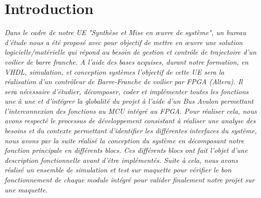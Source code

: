 \section*{Introduction}
\label{Introduction}
\textit{Dans le cadre de notre UE "Synthèse et Mise en œuvre de système", un bureau d'étude nous a été proposé avec pour objectif de mettre en œuvre une solution logicielle/matérielle qui répond au besoin de gestion et contrôle de trajectoire d'un voilier de barre franche.}\vspace{0.5cm}
\textit{\newline A l'aide des bases acquises, durant notre formation, en VHDL, simulation, et conception systèmes l'objectif de cette UE sera la réalisation d'un contrôleur de Barre-Franche de voilier par FPGA (Altera). Il sera nécessaire d'étudier, décomposer, coder et implémenter toutes les fonctions une à une et d'intégrer la globalité du projet à l'aide d'un Bus Avalon permettant l'interconnexion des fonctions au MCU intégré au FPGA.}\vspace{0.5cm}
\textit{\newline Pour réaliser cela, nous avons respecté le processus de développement consistant à réaliser une analyse  des besoins et du contexte permettant d'identifier les différentes interfaces du système, nous avons par la suite réalisé la conception du système en décomposant notre fonction principale en différents blocs. Ces différents blocs ont fait l'objet d'une description fonctionnelle avant d'être implémentés. Suite à cela, nous avons réalisé un ensemble de simulation et test sur maquette pour vérifier le bon fonctionnement de chaque module intégré pour valider finalement notre projet sur une maquette.}